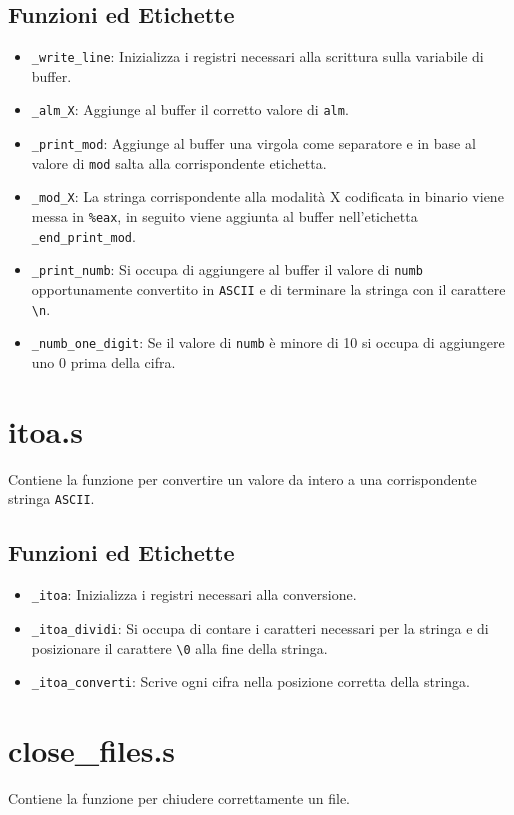 \documentclass[a4paper,11pt]{article}
\newcommand{\itemtt}[1]{\item \texttt{#1}}
\begin{document}
	\subsection{Funzioni ed Etichette}
		\begin{itemize}
			\itemtt{\_write\_line}: Inizializza i registri necessari alla scrittura sulla variabile di buffer.
			\itemtt{\_alm\_X}: Aggiunge al buffer il corretto valore di \texttt{alm}.
			\itemtt{\_print\_mod}: Aggiunge al buffer una virgola come separatore e in base al valore di \texttt{mod} salta alla corrispondente etichetta.
			\itemtt{\_mod\_X}: La stringa corrispondente alla modalità X codificata in binario viene messa in \texttt{\%eax}, in seguito viene aggiunta al buffer nell'etichetta \texttt{\_end\_print\_mod}.
			\itemtt{\_print\_numb}: Si occupa di aggiungere al buffer il valore di \texttt{numb} opportunamente convertito in \texttt{ASCII} e di terminare la stringa con il carattere \texttt{\textbackslash n}.
			\itemtt{\_numb\_one\_digit}: Se il valore di \texttt{numb} è minore di 10 si occupa di aggiungere uno 0 prima della cifra.
		\end{itemize}
	
	\section{itoa.s}
	Contiene la funzione per convertire un valore da intero a una corrispondente stringa \texttt{ASCII}.
	\subsection{Funzioni ed Etichette} 
		\begin{itemize}
			\itemtt{\_itoa}: Inizializza i registri necessari alla conversione.
			\itemtt{\_itoa\_dividi}: Si occupa di contare i caratteri necessari per la stringa e di posizionare il carattere \texttt{\textbackslash 0} alla fine della stringa.
			\itemtt{\_itoa\_converti}: Scrive ogni cifra nella posizione corretta della stringa.
		\end{itemize}
	
	\section{close\_files.s}
	Contiene la funzione per chiudere correttamente un file. 
	

	
	
\end{document}
